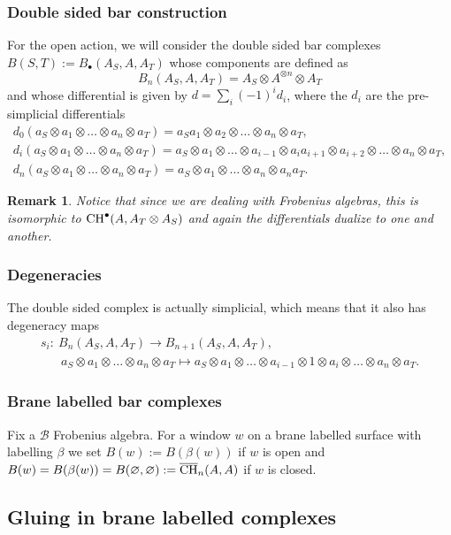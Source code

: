 \documentclass[pdftex]{sigma}
\newtheorem{rmk}[thm]{Remark}
\def\calB{{\mathcal B}}
\def\oto{\otimes \dots \otimes}
\newcommand{\aoa}[2]{a_{#1}\otimes \dots \otimes a_{#2}}
\begin{document}
\subsubsection{Double sided bar construction}
For the open action,
we will consider the double sided bar complexes
$B(S,T):=B_{\bullet}(A_S,A,A_T)$
whose components are def\/ined as
\[
B_n(A_S,A,A_T)=A_S\otimes A^{\otimes n}\otimes A_T
\]
and whose dif\/ferential is given by $d=\sum_i (-1)^i d_i$, where the
$d_i$ are the pre-simplicial dif\/ferentials
\begin{gather*}
d_0 (a_S\otimes a_1 \oto a_n \otimes a_T) = a_Sa_1\otimes \aoa{2}{n}\otimes a_T,\\
d_i (a_S\otimes a_1 \oto a_n \otimes a_T) = a_S\otimes
\aoa{1}{i-1}\otimes a_{i}a_{i+1}\otimes
\aoa{i+2}{n} \otimes a_T,\\
d_{n} (a_S\otimes a_1 \oto a_n \otimes
a_T) = a_S\otimes\aoa{1}{n}\otimes a_n a_T.
\end{gather*}

\begin{rmk}
Notice that since we are dealing with Frobenius algebras, this is
isomorphic to  ${\rm CH}^{\bullet}(A,A_T\otimes A_S)$ and again the
dif\/ferentials dualize to one and another.
\end{rmk}

\subsubsection{Degeneracies}
The double sided complex is actually simplicial,
which means that it also has degeneracy maps
\begin{gather*}
s_i: \ B_n(A_S,A,A_T) \to B_{n+1}(A_S,A,A_T), \\
\phantom{s_i:} \ \ a_S\otimes a_1 \oto a_n \otimes a_T \mapsto a_S\otimes a_1 \oto
a_{i-1}\otimes  1 \otimes a_i \oto a_n \otimes a_T.
\end{gather*}

\subsubsection{Brane labelled  bar complexes}

Fix a $\calB$ Frobenius algebra. For a window $w$ on a brane
labelled surface with labelling $\beta$ we set $B(w):=B(\beta (w))$
if $w$ is open and
$B(w)=B(\beta(w))=B(\varnothing,\varnothing):=\overline{\rm CH}_n(A,A)$ if $w$ is
closed.

\subsection{Gluing in brane labelled complexes}
\end{document}
